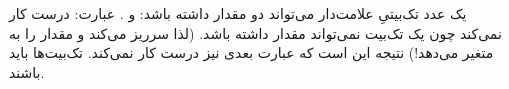 \section{}
\paragraph{}\label{answer:42}
یک عدد تک‌بیتیِ علامت‌دار می‌تواند دو مقدار داشته باشد:  و . عبارت:
درست کار نمی‌کند چون یک تک‌بیت نمی‌تواند مقدار  داشته باشد. (لذا سرریز می‌کند و مقدار  را به متغیر می‌دهد!) نتیجه این است که عبارت بعدی  نیز درست کار نمی‌کند. تک‌بیت‌ها باید  باشند.